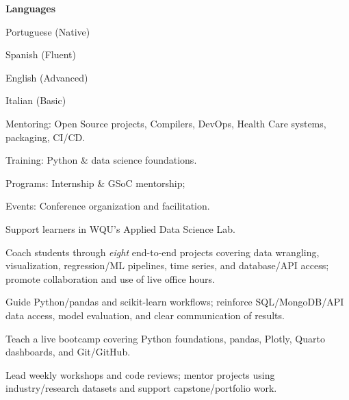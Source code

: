 \documentclass[10pt,a4paper]{article}
\begin{document}
\textbf{Languages}
\begin{tightitemize}
  \item Portuguese (Native)
  \item Spanish (Fluent)
  \item English (Advanced)
  \item Italian (Basic)
\end{tightitemize}

\begin{tightitemize}
  \item Mentoring: Open Source projects, Compilers, DevOps, Health Care systems, packaging, CI/CD.
  \item Training: Python \& data science foundations.
  \item Programs: Internship \& GSoC mentorship;
  \item Events: Conference organization and facilitation.
\end{tightitemize}

\normalsize

\switchcolumn



\begin{tightitemize}
  \item Support learners in WQU's Applied Data Science Lab.
  \item Coach students through \emph{eight} end-to-end projects covering data wrangling, visualization, regression/ML pipelines, time series, and database/API access; promote collaboration and use of live office hours.
  \item Guide Python/pandas and scikit-learn workflows; reinforce SQL/MongoDB/API data access, model evaluation, and clear communication of results.
\end{tightitemize}

\begin{tightitemize}
  \item Teach a live bootcamp covering Python foundations, pandas, Plotly, Quarto dashboards, and Git/GitHub.
  \item Lead weekly workshops and code reviews; mentor projects using industry/research datasets and support capstone/portfolio work.
\end{tightitemize}
\end{document}

